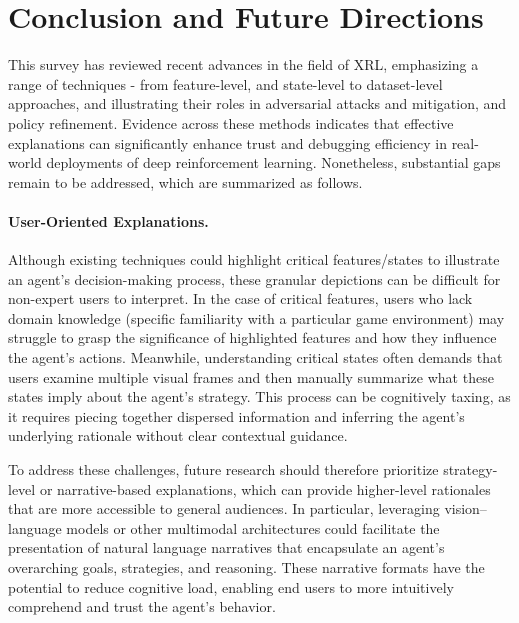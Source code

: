 \section{Conclusion and Future Directions}



This survey has reviewed recent advances in the field of XRL, emphasizing a range of techniques - from feature-level, and state-level to dataset-level approaches, and illustrating their roles in adversarial attacks and mitigation, and policy refinement. Evidence across these methods indicates that effective explanations can significantly enhance trust and debugging efficiency in real-world deployments of deep reinforcement learning. Nonetheless, substantial gaps remain to be addressed, which are summarized as follows.



\paragraph{User-Oriented Explanations.}
Although existing techniques could highlight critical features/states to illustrate an agent’s decision-making process, these granular depictions can be difficult for non-expert users to interpret. In the case of critical features, users who lack domain knowledge (\eg specific familiarity with a particular game environment) may struggle to grasp the significance of highlighted features and how they influence the agent’s actions. Meanwhile, understanding critical states often demands that users examine multiple visual frames and then manually summarize what these states imply about the agent’s strategy. This process can be cognitively taxing, as it requires piecing together dispersed information and inferring the agent’s underlying rationale without clear contextual guidance.

To address these challenges, future research should therefore prioritize strategy-level or narrative-based explanations, which can provide higher-level rationales that are more accessible to general audiences. In particular, leveraging vision–language models or other multimodal architectures could facilitate the presentation of natural language narratives that encapsulate an agent’s overarching goals, strategies, and reasoning. These narrative formats have the potential to reduce cognitive load, enabling end users to more intuitively comprehend and trust the agent’s behavior.


